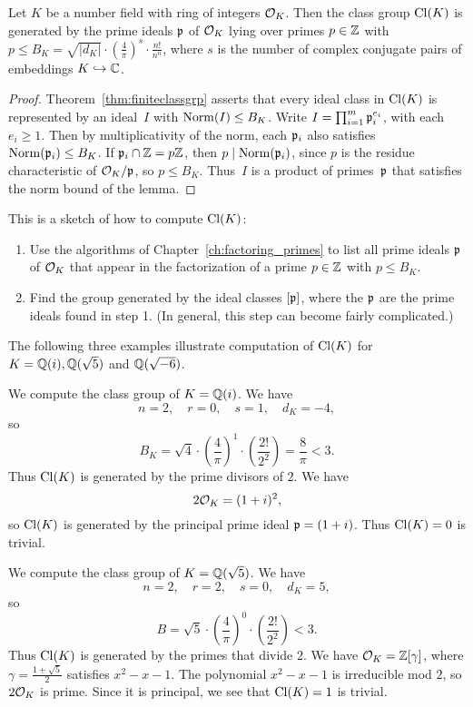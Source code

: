 \begin{lemma}
Let $K$ be a number field with ring of integers $\mathcal{O}_K$.  Then the
class group $\operatorname{Cl}(K)$ is generated by the prime ideals $\mathfrak{p}$ of $\mathcal{O}_K$
lying over primes $p\in\mathbb{Z}$ with $p\leq B_K = \sqrt{|d_K|}\cdot
\left(\frac{4}{\pi}\right)^s\cdot \frac{n!}{n^n}$,
where $s$ is the number of complex conjugate pairs of embeddings
$K\hookrightarrow\mathbb{C}$.
\end{lemma}
\begin{proof}
Theorem~\ref{thm:finiteclassgrp}
asserts that every ideal class in $\operatorname{Cl}(K)$ is represented by
an ideal~$I$ with $\operatorname{Norm}(I)\leq B_K$.  Write $I=\prod_{i=1}^m
\mathfrak{p}_i^{e_i}$, with each $e_i\geq 1$.  Then by multiplicativity of the
norm, each $\mathfrak{p}_i$ also satisfies $\operatorname{Norm}(\mathfrak{p}_i)\leq B_K$.  If $\mathfrak{p}_i \cap
\mathbb{Z}=p\mathbb{Z}$, then $p\mid \operatorname{Norm}(\mathfrak{p}_i)$, since $p$ is the residue
characteristic of $\mathcal{O}_K/\mathfrak{p}$, so $p\leq B_K$. Thus~$I$ is a product of
primes~$\mathfrak{p}$ that satisfies the norm bound of the lemma.
\end{proof}

This is a sketch of how to compute $\operatorname{Cl}(K)$:
\begin{enumerate}
\item Use the algorithms of Chapter~\ref{ch:factoring_primes} to list all
prime ideals $\mathfrak{p}$ of $\mathcal{O}_K$ that appear in the factorization
of a prime $p\in \mathbb{Z}$ with $p\leq B_K$.
\item Find the group generated  by the ideal
classes $[\mathfrak{p}]$, where the $\mathfrak{p}$ are the prime ideals
found in step 1.  (In general, this step can become
fairly complicated.)
\end{enumerate}
The following three examples illustrate computation of $\operatorname{Cl}(K)$
for $K=\mathbb{Q}(i), \mathbb{Q}(\sqrt{5})$ and $\mathbb{Q}(\sqrt{-6})$.
\begin{example}
We compute the class group of $K=\mathbb{Q}(i)$.  We have
$$
  n = 2, \quad r=0, \quad s=1, \quad d_K = -4,
$$
so
$$
  B_K = \sqrt{4}\cdot \left(\frac{4}{\pi}\right)^1
   \cdot\left(\frac{2!}{2^2}\right) = \frac{8}{\pi} <3.
$$
Thus $\operatorname{Cl}(K)$ is generated by the prime divisors
of $2$.  We have
$$
 2\mathcal{O}_K = (1+i)^2,
$$
so $\operatorname{Cl}(K)$ is generated by the principal prime
ideal $\mathfrak{p}=(1+i)$. Thus $\operatorname{Cl}(K)=0$ is trivial.
\end{example}

\begin{example}
We compute the class group of $K=\mathbb{Q}(\sqrt{5})$.
We have
$$
  n = 2, \quad r = 2, \quad s=0, \quad d_K = 5,
$$
so $$B = \sqrt{5}\cdot \left(\frac{4}{\pi}\right)^0\cdot
\left(\frac{2!}{2^2}\right)  < 3.$$
Thus $\operatorname{Cl}(K)$ is generated by the primes that divide $2$.
We have $\mathcal{O}_K=\mathbb{Z}[\gamma]$, where $\gamma=\frac{1+\sqrt{5}}{2}$
satisfies $x^2-x-1$.   The polynomial $x^2-x-1$ is irreducible
mod $2$, so $2\mathcal{O}_K$ is prime.  Since it is principal, we see
that $\operatorname{Cl}(K)=1$ is trivial.
\end{example}

